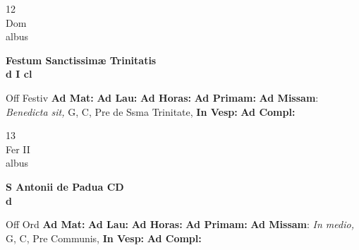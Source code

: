 \documentclass[10pt, openany]{book}
\begin{document}
        \begin{center}
            \begin{minipage}{3.5in}
                \vspace{2em}
                \begin{minipage}{0.5in}
                    {\Huge 12} \\
                    {\normalsize Dom} \\
                    {\normalsize albus}
                \end{minipage}
                \begin{minipage}{3.0in}
                    \textbf{ \large Festum Sanctissimæ Trinitatis \\
                    \textnormal{\normalsize d I cl}} \\ 
                \end{minipage}
                \begin{justify}Off Festiv
                    \textbf{Ad Mat: }
                    \textbf{Ad Lau: }
                    \textbf{Ad Horas: }
                    \textbf{Ad Primam: }\textbf{Ad Missam}: \textit{Benedicta sit,} G, C, Pre de Ssma Trinitate,  
                    \textbf{In Vesp: }
                    \textbf{Ad Compl: }
                \end{justify}
            \end{minipage}
        \end{center}
    
        \begin{center}
            \begin{minipage}{3.5in}
                \vspace{2em}
                \begin{minipage}{0.5in}
                    {\Huge 13} \\
                    {\normalsize Fer II} \\
                    {\normalsize albus}
                \end{minipage}
                \begin{minipage}{3.0in}
                    \textbf{ \large S Antonii de Padua CD \\
                    \textnormal{\normalsize d}} \\ 
                \end{minipage}
                \begin{justify}Off Ord
                    \textbf{Ad Mat: }
                    \textbf{Ad Lau: }
                    \textbf{Ad Horas: }
                    \textbf{Ad Primam: }\textbf{Ad Missam}: \textit{In medio,} G, C, Pre Communis,  
                    \textbf{In Vesp: }
                    \textbf{Ad Compl: }
                \end{justify}
            \end{minipage}
        \end{center}
    
\end{document}
